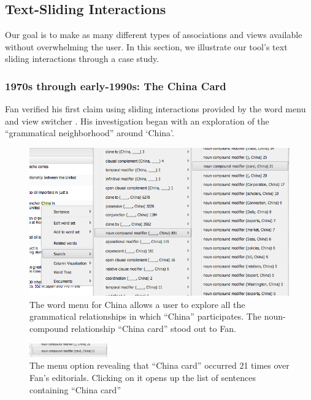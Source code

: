 \documentclass{sig-alternate}
\begin{document}
\subsection{Text-Sliding Interactions}

Our goal is to make as many different types of associations and views available without overwhelming the user. In this section, we illustrate our tool's text sliding interactions through a case study. 

\subsubsection{1970s through early-1990s: The China Card}
Fan verified his first claim using sliding interactions provided by the word menu and view switcher . His investigation began with an exploration of the ``grammatical neighborhood'' around `China'.

\begin{figure}[h!]
\includegraphics[width=\textwidth]{fig/chris/01.png}
\caption{The word menu for China allows a user to explore all the grammatical relationships in which ``China'' participates. The noun-compound relationship ``China card'' stood out to Fan. \label{fig:chris01}}
\end{figure}

\begin{figure}[h!]
\includegraphics[width=0.3\textwidth]{fig/chris/01b.png}
\caption{ The menu option revealing that ``China card'' occurred 21 times over Fan's editorials. Clicking on it opens up the list of sentences containing ``China card''  \label{fig:chris01b}}
\end{figure}
\end{document}
